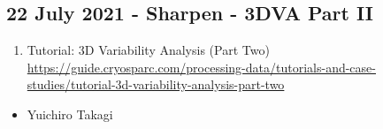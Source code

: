 \documentclass[11pt, oneside]{article}   	%
\begin{document}
\subsection{22 July 2021 - Sharpen - 3DVA Part II}
\begin{enumerate}
	\item Tutorial: 3D Variability Analysis (Part Two) \url{https://guide.cryosparc.com/processing-data/tutorials-and-case-studies/tutorial-3d-variability-analysis-part-two}
\end{enumerate}
\begin{itemize}
	\item Yuichiro Takagi
\end{itemize}





\end{document}
